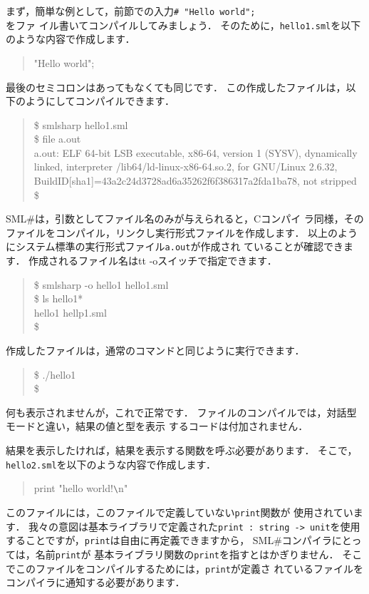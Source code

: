 \documentclass{jbook}
\newcommand{\smlsharp}{SML\#}
\newenvironment{program}{\begin{quote}\begin{tt}}%
                        {\end{tt}\end{quote}}
\begin{document}
	まず，簡単な例として，前節での入力{\tt \# "Hello world";\\}をファ
イル書いてコンパイルしてみましょう．
	そのために，{\tt hello1.sml}を以下のような内容で作成します．
\begin{program}
"Hello world";
\end{program}
	最後のセミコロンはあってもなくても同じです．
	この作成したファイルは，以下のようにしてコンパイルできます．
\begin{program}
\$ smlsharp hello1.sml\\
\$ file a.out\\
a.out: ELF 64-bit LSB executable, x86-64,
version 1 (SYSV), dynamically linked,
interpreter /lib64/ld-linux-x86-64.so.2,
for GNU/Linux 2.6.32,
BuildID[sha1]=43a2c24d3728ad6a35262f6f386317a2fda1ba78,
not stripped\\
\$
\end{program}
	\smlsharp{}は，引数としてファイル名のみが与えられると，Cコンパイ
ラ同様，そのファイルをコンパイル，リンクし実行形式ファイルを作成します．
	以上のようにシステム標準の実行形式ファイル{\tt a.out}が作成され
ていることが確認できます．
	作成されるファイル名は{tt -o}スイッチで指定できます．
\begin{program}
\$ smlsharp -o hello1 hello1.sml\\
\$ ls hello1*\\
hello1   hellp1.sml\\
\$ 
\end{program}
	作成したファイルは，通常のコマンドと同じように実行できます．
\begin{program}
\$ ./hello1\\
\$ 
\end{program}
	何も表示されませんが，これで正常です．
	ファイルのコンパイルでは，対話型モードと違い，結果の値と型を表示
するコードは付加されません．

	結果を表示したければ，結果を表示する関数を呼ぶ必要があります．
	そこで，{\tt hello2.sml}を以下のような内容で作成します．
\begin{program}
print "hello world!\verb|\|n"
\end{program}
	このファイルには，このファイルで定義していない{\tt print}関数が
使用されています．
	我々の意図は基本ライブラリで定義された{\tt print :~string ->
unit}を使用することですが，{\tt print}は自由に再定義できますから，
\smlsharp{}コンパイラにとっては，名前{\tt print}が
基本ライブラリ関数の{\tt print}を指すとはかぎりません．
	そこでこのファイルをコンパイルするためには，{\tt print}が定義さ
れているファイルをコンパイラに通知する必要があります．
\end{document}
